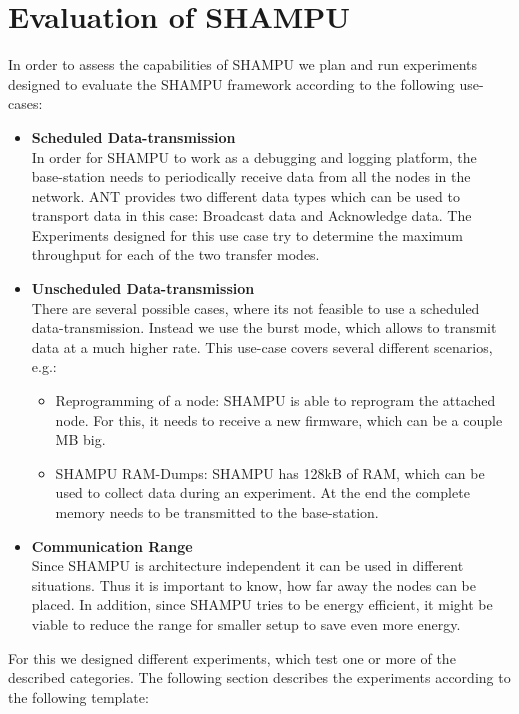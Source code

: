 \chapter{Evaluation of SHAMPU}
In order to assess the capabilities of SHAMPU we plan and run experiments designed to evaluate the SHAMPU framework according to the following use-cases:
\begin{itemize}
	\item{\textbf{Scheduled Data-transmission}} \hfill \\ In order for SHAMPU to work as a debugging and logging platform, the base-station needs to periodically receive data from all the nodes in the network. ANT provides two different data types which can be used to transport data in this case: Broadcast data and Acknowledge data. The Experiments designed for this use case try to determine the maximum throughput for each of the two transfer modes.
	\item{\textbf{Unscheduled Data-transmission}} \hfill \\ There are several possible cases, where its not feasible to use a scheduled data-transmission. Instead we use the burst mode, which allows to transmit data at a much higher rate. This use-case covers several different scenarios, e.g.:
	\begin{itemize}
		\item{}Reprogramming of a node: SHAMPU is able to reprogram the attached node. For this, it needs to receive a new firmware, which can be a couple MB big.
		\item{}SHAMPU RAM-Dumps: SHAMPU has 128kB of RAM, which can be used to collect data during an experiment. At the end the complete memory needs to be transmitted to the base-station.
	\end{itemize}
	\item{\textbf{Communication Range}} \hfill \\ Since SHAMPU is architecture independent it can be used in different situations. Thus it is important to know, how far away the nodes can be placed. In addition, since SHAMPU tries to be energy efficient, it might be viable to reduce the range for smaller setup to save even more energy.
\end{itemize}

For this we designed different experiments, which test one or more of the described categories. The following section describes the experiments according to the following template:

